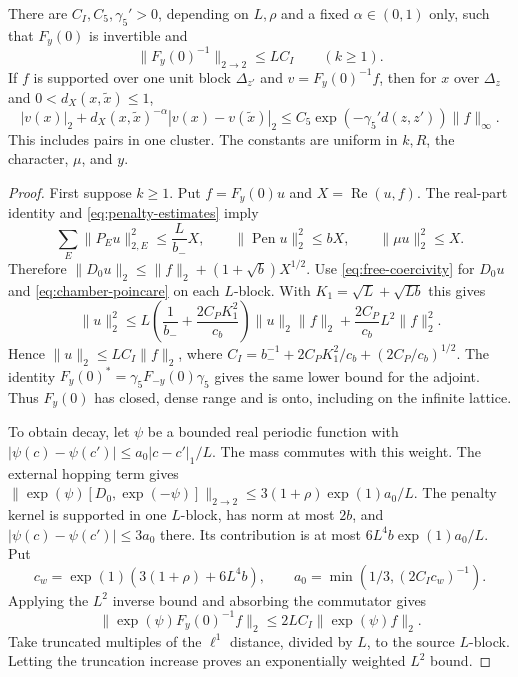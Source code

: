 \begin{proposition}\label{prop:zero-blocked-inverse}
There are $C_I,C_5,\gamma_5'>0$, depending on $L,\rho$ and a fixed
$\alpha\in(0,1)$ only, such that $F_y(0)$ is invertible and
\[
 \|F_y(0)^{-1}\|_{2\to2}\le LC_I\qquad(k\ge1).
\]
If $f$ is supported over one unit block $\Delta_{z'}$ and
$v=F_y(0)^{-1}f$, then for $x$ over $\Delta_z$ and
$0<d_X(x,\widetilde x)\le1$,
\begin{equation}\label{eq:zero-blocked-holder}
 |v(x)|_2+d_X(x,\widetilde x)^{-\alpha}|v(x)-v(\widetilde x)|_2
 \le C_5\exp(-\gamma_5'd(z,z'))\|f\|_\infty.
\end{equation}
This includes pairs in one cluster. The constants are uniform in
$k,R$, the character, $\mu$, and $y$.
\end{proposition}

\begin{proof}
First suppose $k\ge1$. Put $f=F_y(0)u$ and
$X=\operatorname{Re}(u,f)$. The real-part identity
and \eqref{eq:penalty-estimates} imply
\[
 \sum_E\|P_Eu\|_{2,E}^2\le\frac L{b_-}X,\qquad
 \|\operatorname{Pen}u\|_2^2\le bX,\qquad
 \|\mu u\|_2^2\le X.
\]
Therefore $\|D_0u\|_2\le\|f\|_2+(1+\sqrt b)X^{1/2}$.
Use \eqref{eq:free-coercivity} for $D_0u$ and
\eqref{eq:chamber-poincare} on each $L$-block. With
$K_1=\sqrt L+\sqrt{Lb}$ this gives
\[
 \|u\|_2^2\le L\left(\frac1{b_-}+\frac{2C_PK_1^2}{c_b}\right)
           \|u\|_2\|f\|_2
       +\frac{2C_P}{c_b}L^2\|f\|_2^2.
\]
Hence $\|u\|_2\le LC_I\|f\|_2$, where
$C_I=b_-^{-1}+2C_PK_1^2/c_b+(2C_P/c_b)^{1/2}$.
The identity $F_y(0)^*=\gamma_5F_{-y}(0)\gamma_5$ gives the same
lower bound for the adjoint. Thus $F_y(0)$ has closed, dense range
and is onto, including on the infinite lattice.

To obtain decay, let $\psi$ be a bounded real periodic function with
$|\psi(c)-\psi(c')|\le a_0|c-c'|_1/L$. The mass commutes with this
weight. The external hopping term gives
$\|\exp(\psi)[D_0,\exp(-\psi)]\|_{2\to2}
\le3(1+\rho)\exp(1)a_0/L$.
The penalty kernel is supported in one $L$-block, has norm at most
$2b$, and $|\psi(c)-\psi(c')|\le3a_0$ there. Its contribution is at
most $6L^4b\exp(1)a_0/L$. Put
\[
 c_w=\exp(1)(3(1+\rho)+6L^4b),\qquad
 a_0=\min(1/3,(2C_Ic_w)^{-1}).
\]
Applying the $L^2$ inverse bound and absorbing the commutator gives
\begin{equation}\label{eq:weighted-block-inverse}
 \|\exp(\psi)F_y(0)^{-1}f\|_2
       \le2LC_I\|\exp(\psi)f\|_2.
\end{equation}
Take truncated multiples of the $\ell^1$ distance, divided by $L$,
to the source $L$-block. Letting the truncation increase proves an
exponentially weighted $L^2$ bound.


\end{proof}
